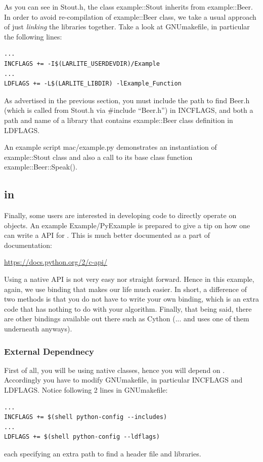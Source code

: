 As you can see in {\ttfamily Stout.h}, the \CPP class {\ttfamily example::Stout} inherits from
{\ttfamily example::Beer}. In order to avoid re-compilation of {\ttfamily example::Beer} class,
we take a usual approach of just {\it linking} the libraries together. Take a look at 
{\ttfamily GNUmakefile}, in particular the following lines:
\begin{lstlisting}
...
INCFLAGS += -I$(LARLITE_USERDEVDIR)/Example
...
LDFLAGS += -L$(LARLITE_LIBDIR) -lExample_Function
\end{lstlisting}
As advertised in the previous section, you must include the path to find {\ttfamily Beer.h} (which
is called from {\ttfamily Stout.h} via {\ttfamily \#include ``Beer.h''}) in {\ttfamily INCFLAGS}, and
both a path and name of a library that contains {\ttfamily example::Beer} class definition in
{\ttfamily LDFLAGS}. 

An example script {\ttfamily mac/example.py} demonstrates an instantiation of {\ttfamily example::Stout}
class and also a call to its base class function {\ttfamily example::Beer::Speak()}.

\subsection{\python in \CPP}
Finally, some users are interested in developing \CPP code to directly operate on \python objects.
An example {\ttfamily Example/PyExample} is prepared to give a tip on how one can write a \CPP
API for \python. This is much better documented as a part of \python documentation:
\begin{center}
{\color{blue}\url{https://docs.python.org/2/c-api/}}
\end{center}

Using a native \python \CPP API is not very easy nor straight forward. Hence in this example,
again, we use \PyROOT binding that makes our life much easier. In short, a difference of two
methods is that you do not have to write your own binding, which is an extra code that has nothing
to do with your algorithm. Finally, that being said, there are other bindings available out there
such as {\ttfamily Cython} (... and \PyROOT uses one of them underneath anyways).

\subsubsection{External Dependnecy}
First of all, you will be using native \python classes, hence you will depend on \python.
Accordingly you have to modify {\ttfamily GNUmakefile}, in particular {\ttfamily INCFLAGS} and
{\ttfamily LDFLAGS}. Notice following 2 lines in {\ttfamily GNUmakefile}:
\begin{lstlisting}
...
INCFLAGS += $(shell python-config --includes)
...
LDFLAGS += $(shell python-config --ldflags)
\end{lstlisting}
each specifying an extra path to find a \python header file and libraries.

